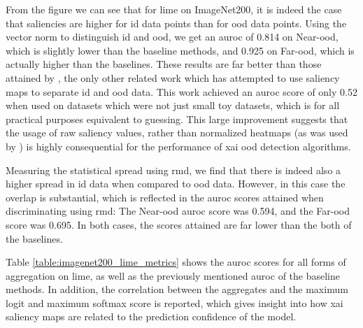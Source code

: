 \documentclass[UKenglish]{uiomasterthesis} %
\theoremstyle{definition}
\begin{document}
From the figure we can see that for \ac{lime} on ImageNet200, it is indeed the case that saliencies are higher for \ac{id} data points than for \ac{ood} data points. Using the vector norm to distinguish \ac{id} and \ac{ood}, we get an \ac{auroc} of 0.814 on Near-\ac{ood}, which is slightly lower than the baseline methods, and 0.925 on Far-\ac{ood}, which is actually higher than the baselines. These results are far better than those attained by \cite{martinez}, the only other related work which has attempted to use saliency maps to separate \ac{id} and \ac{ood} data. This work achieved an \ac{auroc} score of only 0.52 when used on datasets which were not just small toy datasets, which is for all practical purposes equivalent to guessing. This large improvement suggests that the usage of raw saliency values, rather than normalized heatmaps (as was used by \cite{martinez}) is highly consequential for the performance of \ac{xai} \ac{ood} detection algorithms.

Measuring the statistical spread using \ac{rmd}, we find that there is indeed also a higher spread in \ac{id} data when compared to \ac{ood} data. However, in this case the overlap is substantial, which is reflected in the \ac{auroc} scores attained when discriminating using \ac{rmd}: The Near-\ac{ood} \ac{auroc} score was 0.594, and the Far-\ac{ood} score was 0.695. In both cases, the scores attained are far lower than the both of the baselines.



Table \ref{table:imagenet200_lime_metrics} shows the \ac{auroc} scores for all forms of aggregation on \ac{lime}, as well as the previously mentioned \ac{auroc} of the baseline methods. In addition, the correlation between the aggregates and the maximum logit and maximum softmax score is reported, which gives insight into how \ac{xai} saliency maps are related to the prediction confidence of the model.
\end{document}
